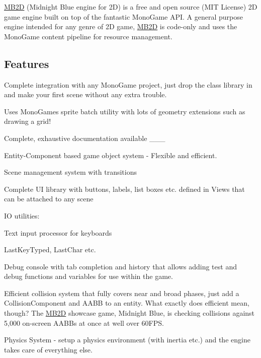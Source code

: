 \hyperlink{namespace_m_b2_d}{M\+B2D} (Midnight Blue engine for 2D) is a free and open source (M\+IT License) 2D game engine built on top of the fantastic Mono\+Game A\+PI. A general purpose engine intended for any genre of 2D game, \hyperlink{namespace_m_b2_d}{M\+B2D} is code-\/only and uses the Mono\+Game content pipeline for resource management.

\subsection*{Features}


\begin{DoxyItemize}
\item Complete integration with any Mono\+Game project, just drop the class library in and make your first scene without any extra trouble.
\begin{DoxyItemize}
\item Uses Mono\+Games sprite batch utility with lots of geometry extensions such as drawing a grid!
\end{DoxyItemize}
\item Complete, exhaustive documentation available \+\_\+\+\_\+\+\_\+
\item Entity-\/\+Component based game object system -\/ Flexible and efficient.
\item Scene management system with transitions
\item Complete UI library with buttons, labels, list boxes etc. defined in {\ttfamily Views} that can be attached to any scene
\item IO utilities\+:
\begin{DoxyItemize}
\item Text input processor for keyboards
\item {\ttfamily Last\+Key\+Typed}, {\ttfamily Last\+Char} etc.
\end{DoxyItemize}
\item Debug console with tab completion and history that allows adding test and debug functions and variables for use within the game.
\item Efficient collision system that fully covers near and broad phases, just add a {\ttfamily Collision\+Component} and A\+A\+BB to an entity. What exactly does efficient mean, though? The \hyperlink{namespace_m_b2_d}{M\+B2D} showcase game, Midnight Blue, is checking collisions against 5,000 on-\/screen A\+A\+BB\textquotesingle{}s at once at well over 60\+F\+PS.
\item Physics System -\/ setup a physics environment (with inertia etc.) and the engine takes care of everything else.

\end{DoxyItemize}

